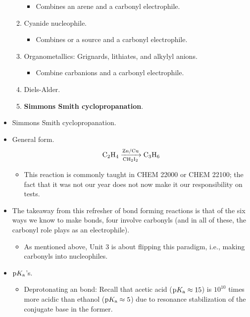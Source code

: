 \documentclass[../notes.tex]{subfiles}
\begin{document}
\begin{itemize}
\begin{enumerate}
\begin{itemize}
            \item Combines an arene and a carbonyl electrophile.
        \end{itemize}
        \item Cyanide nucleophile.
        \begin{itemize}
            \item Combines  or a  source and a carbonyl electrophile.
        \end{itemize}
        \item Organometallics: Grignards, lithiates, and alkylyl anions.
        \begin{itemize}
            \item Combine carbanions and a carbonyl electrophile.
        \end{itemize}
        \item Diels-Alder.
        \item \textbf{Simmons Smith cyclopropanation}.
    \end{enumerate}
    \item Simmons Smith cyclopropanation.
    \item General form.
    \begin{equation*}
        \ce{C2H4 ->[Zn/Cu][CH2I2] C3H6}
    \end{equation*}
    \begin{itemize}
        \item This reaction is commonly taught in CHEM 22000 or CHEM 22100; the fact that it was not our year does not now make it our responsibility on tests.
    \end{itemize}
    \item The takeaway from this refresher of  bond forming reactions is that of the six ways we know to make  bonds, four involve carbonyls (and in all of these, the carbonyl role plays as an electrophile).
    \begin{itemize}
        \item As mentioned above, Unit 3 is about flipping this paradigm, i.e., making carbonyls into nucleophiles.
    \end{itemize}
    \item $\text{p}K_\text{a}$'s.
    \begin{itemize}
        \item Deprotonating an  bond: Recall that acetic acid ($\text{p}K_\text{a}\approx 15$) is $10^{10}$ times more acidic than ethanol ($\text{p}K_\text{a}\approx 5$) due to resonance stabilization of the conjugate base in the former.

\end{itemize}
\end{itemize}
\end{document}

